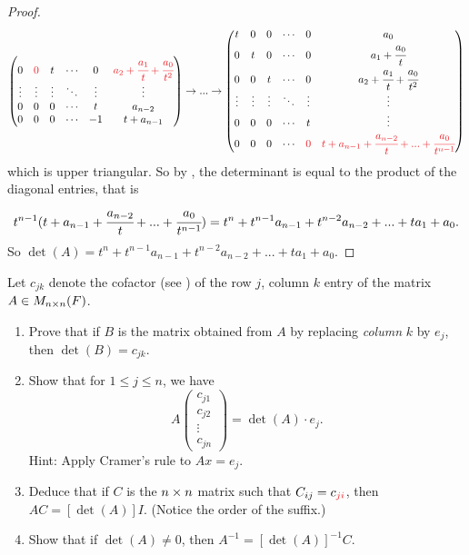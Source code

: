 \begin{proof}
\begin{align*}
\begin{pmatrix}
        0       & \RED{0} & t      & \cdots & 0      & \RED{a_{2} + \cfrac{a_{1}}{t} + \cfrac{a_0}{t^2}} \\
        \vdots  & \vdots  & \vdots & \ddots & \vdots & \vdots \\
        0       & 0       & 0      & \cdots & t      & a_{n-2} \\
        0       & 0       & 0      & \cdots & -1     & t + a_{n-1}   
    \end{pmatrix}
    \to ... \to
    \begin{pmatrix}
        t       & 0       & 0      & \cdots & 0       & a_{0} \\
        0       & t       & 0      & \cdots & 0       & a_{1} + \cfrac{a_0}{t} \\
        0       & 0       & t      & \cdots & 0       & a_{2} + \cfrac{a_{1}}{t} + \cfrac{a_0}{t^2} \\
        \vdots  & \vdots  & \vdots & \ddots & \vdots  & \vdots \\
        0       & 0       & 0      & \cdots & t       & \vdots \\
        0       & 0       & 0      & \cdots & \RED{0} & \RED{t + a_{n-1} + \cfrac{a_{n-2}}{t} + ... + \cfrac{a_0}{t^{n-1}}}
    \end{pmatrix}
\end{align*}
which is upper triangular.
So by , the determinant is equal to the product of the diagonal entries, that is
\[
    t^{n - 1} (t + a_{n-1} + \cfrac{a_{n-2}}{t} + ... + \cfrac{a_0}{t^{n-1}})
    = t^n + t^{n - 1} a_{n - 1} + t^{n - 2} a_{n - 2} + ... + t a_1 + a_0.
\]
So \(\det(A) = t^n + t^{n - 1} a_{n - 1} + t^{n - 2} a_{n - 2} + ... + t a_1 + a_0\).
\end{proof}

\begin{exercise} \label{exercise 4.3.25}
Let \(c_{jk}\) denote the cofactor (see ) of the row \(j\), column \(k\) entry of the matrix \(A \in M_{n \times n}(F)\).
\begin{enumerate}
\item Prove that if \(B\) is the matrix obtained from \(A\) by replacing \emph{column} \(k\) by \(e_j\), then \(\det(B) = c_{jk}\).

\item Show that for \(1 \le j \le n\), we have
\[
    A \begin{pmatrix} c_{j1} \\ c_{j2} \\ \vdots \\ c_{jn} \end{pmatrix}
    = \det(A) \cdot e_j.
\]
Hint: Apply Cramer's rule to \(Ax = e_j\).

\item Deduce that if \(C\) is the \(n \times n\) matrix such that \(C_{ij} = c_{\RED{ji}}\), then \(AC = [\det(A)]I\).
(Notice the order of the suffix.)

\item Show that if \(\det(A) \ne 0\), then \(A^{-1} = [\det(A)]^{-1}C\).
\end{enumerate}
\end{exercise}

